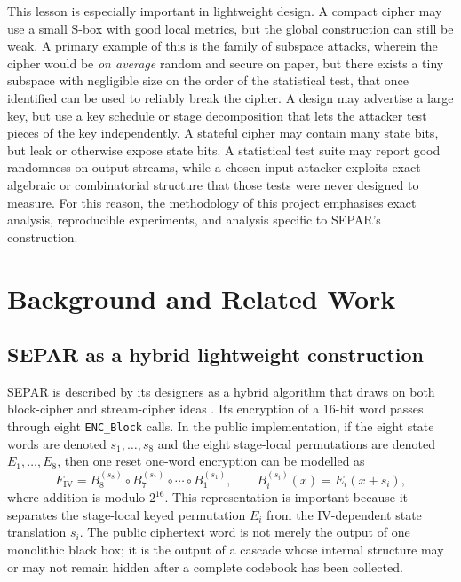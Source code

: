 \documentclass[11pt]{article}
\begin{document}
This lesson is especially important in lightweight design. A compact cipher may use a small S-box with good local metrics, but the global construction can still be weak. A primary example of this is the family of subspace attacks, wherein the cipher would be \textit{on average} random and secure on paper, but there exists a tiny subspace with negligible size on the order of the statistical test, that once identified can be used to reliably break the cipher. A design may advertise a large key, but use a key schedule or stage decomposition that lets the attacker test pieces of the key independently. A stateful cipher may contain many state bits, but leak or otherwise expose state bits. A statistical test suite may report good randomness on output streams, while a chosen-input attacker exploits exact algebraic or combinatorial structure that those tests were never designed to measure. For this reason, the methodology of this project emphasises exact analysis, reproducible experiments, and analysis specific to SEPAR's construction.\\


\section{Background and Related Work}

\subsection{SEPAR as a hybrid lightweight construction}

SEPAR is described by its designers as a hybrid algorithm that draws on both block-cipher and stream-cipher ideas \cite{VahiJassbi2020}. Its encryption of a 16-bit word passes through eight \texttt{ENC\_Block} calls. In the public implementation, if the eight state words are denoted $s_1,\ldots,s_8$ and the eight stage-local permutations are denoted $E_1,\ldots,E_8$, then one reset one-word encryption can be modelled as
\[
F_{\mathrm{IV}}
=B_8^{(s_8)}\circ B_7^{(s_7)}\circ \cdots \circ B_1^{(s_1)},
\qquad
B_i^{(s_i)}(x)=E_i(x+s_i),
\]
where addition is modulo $2^{16}$. This representation is important because it separates the stage-local keyed permutation $E_i$ from the IV-dependent state translation $s_i$. The public ciphertext word is not merely the output of one monolithic black box; it is the output of a cascade whose internal structure may or may not remain hidden after a complete codebook has been collected.\\
\end{document}
